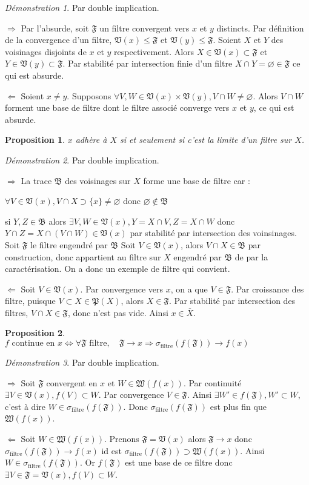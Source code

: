 \documentclass[a4paper, 11pt, french]{book}
\newenvironment{itemise}{\itemize}{\enditemize}
\theoremstyle{plain} %
\newtheorem{proposition}{Proposition}
\theoremstyle{definition} %
\theoremstyle{remark} %
\newtheorem*{demonstration}{Démonstration}
\newcommand{\1}{\mathds{1}}
\newcommand\vide{\varnothing}
\renewcommand{\frak}[1]{\mathfrak{#1}}
\newcommand{\rm}[1]{\mathrm{#1}}
\newcommand\equivalence[3]{
	\begin{demonstration}
		#1
		\begin{itemise}
			\item[$\Longrightarrow$] #2
			\item[$\Longleftarrow$] #3
		\end{itemise}
	\end{demonstration}
}
\begin{document}
\equivalence{Par double implication.}{
	Par l'absurde, soit $\frak{F}$ un filtre convergent vers $x$ et $y$ distincts.
		Par définition de la convergence d'un filtre, $\frak{V}(x)\leqslant\frak{F}$ et $\frak{V}(y)\leqslant\frak{F}$.
		Soient $X$ et $Y$ des voisinages disjoints de $x$ et $y$ respectivement.
		Alors $X\in\frak{V}(x)\subset\frak{F}$ et $Y\in\frak{V}(y)\subset\frak{F}$.
		Par stabilité par intersection finie d'un filtre $X\cap Y=\vide\in\frak{F}$ ce qui est absurde.
}{
	Soient $x\neq y$.
		Supposons $\forall V, W\in\frak{V}(x)\times\frak{V}(y), V\cap W\neq\vide$.
		Alors $V\cap W$ forment une base de filtre dont le filtre associé converge vers $x$ et $y$, ce qui est absurde.
}

\begin{proposition}
	$x$ adhère à $X$ si et seulement si c'est la limite d'un filtre sur $X$.
\end{proposition}

\equivalence{Par double implication.}{
	La trace $\frak{B}$ des voisinages sur $X$ forme une base de filtre car :
		\begin{itemise}
			\item $\forall V\in\frak{V}(x), V\cap X\supset\{x\}\neq\vide$ donc $\vide\notin\frak{B}$
			\item si $Y, Z\in\frak{B}$ alors $\exists V, W\in\frak{V}(x), Y=X\cap V, Z=X\cap W$ donc $Y\cap Z=X\cap(V\cap W)\in\frak{V}(x)$ par stabilité par intersection des voinsinages.
		\end{itemise}
		Soit $\frak{F}$ le filtre engendré par $\frak{B}$
		Soit $V\in\frak{V}(x)$, alors $V\cap X\in\frak{B}$ par construction, donc appartient au filtre sur $X$ engendré par $\frak{B}$ de par la caractérisation.
		On a donc un exemple de filtre qui convient.
}{
	Soit $V\in\frak{V}(x)$.
		Par convergence vers $x$, on a que $V\in\frak{F}$.
		Par croissance des filtre, puisque $V\subset X\in\frak{P}(X)$, alors $X\in\frak{F}$.
		Par stabilité par intersection des filtres, $V\cap X\in\frak{F}$, donc n'est pas vide.
		Ainsi $x\in\overline{X}$.
}

\begin{proposition}
	$f\text{ continue en }x\iff\forall\frak{F}\text{ filtre},\quad\frak{F}\rightarrow x\Rightarrow\sigma_\rm{filtre}(f(\frak{F}))\rightarrow f(x)$
\end{proposition}

\equivalence{Par double implication.}{
	Soit $\frak{F}$ convergent en $x$ et $W\in\frak{W}(f(x))$.
		Par continuité $\exists V\in\frak{V}(x), f(V)\subset W$.
		Par convergence $V\in\frak{F}$.
		Ainsi $\exists W'\in f(\frak{F}), W'\subset W$, c'est à dire $W\in\sigma_\rm{filtre}(f(\frak{F}))$.
		Donc $\sigma_\rm{filtre}(f(\frak{F}))$ est plus fin que $\frak{W}(f(x))$.
}{
	Soit $W\in\frak{W}(f(x))$.
		Prenons $\frak{F}=\frak{V}(x)$ alors $\frak{F}\rightarrow x$ donc $\sigma_\rm{filtre}(f(\frak{F}))\rightarrow f(x)$ id est $\sigma_\rm{filtre}(f(\frak{F}))\supset\frak{W}(f(x))$.
		Ainsi $W\in\sigma_\rm{filtre}(f(\frak{F}))$.
		Or $f(\frak{F})$ est une base de ce filtre donc $\exists V\in\frak{F}=\frak{V}(x), f(V)\subset W$.
}
\end{document}

